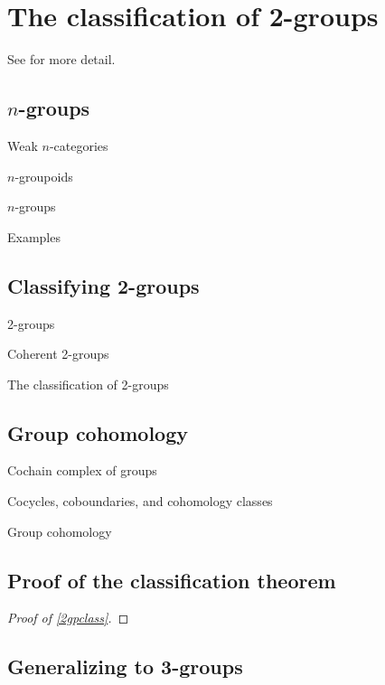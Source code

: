 \section{The classification of 2-groups}

See \cite{hda5} for more detail. 

\subsection{$n$-groups}

\begin{defn} Weak $n$-categories \end{defn}

\begin{defn} $n$-groupoids \end{defn}

\begin{defn} $n$-groups \end{defn}

\begin{example} Examples \end{example}

\subsection{Classifying 2-groups}

\begin{defn} 2-groups \end{defn}

\begin{defn} Coherent 2-groups \end{defn}

\begin{thm} \label{2gpclass} The classification of 2-groups \end{thm}

\subsection{Group cohomology}

\begin{defn} Cochain complex of groups \end{defn}

\begin{defn} Cocycles, coboundaries, and cohomology classes \end{defn}

\begin{defn} Group cohomology \end{defn}

\subsection{Proof of the classification theorem}

\begin{proof}[Proof of \cref{2gpclass}] \end{proof}

\subsection{Generalizing to 3-groups}